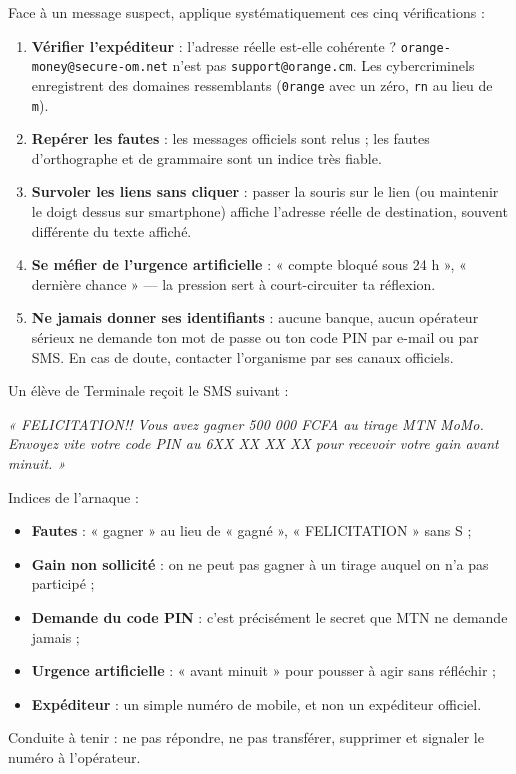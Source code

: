 \documentclass[11pt]{article}
\begin{document}
\begin{methode}
Face à un message suspect, applique systématiquement ces cinq vérifications :
\begin{enumerate}
  \item \textbf{Vérifier l'expéditeur} : l'adresse réelle est-elle cohérente ? \texttt{orange-money@secure-om.net} n'est pas \texttt{support@orange.cm}. Les cybercriminels enregistrent des domaines ressemblants (\texttt{0range} avec un zéro, \texttt{rn} au lieu de \texttt{m}).
  \item \textbf{Repérer les fautes} : les messages officiels sont relus ; les fautes d'orthographe et de grammaire sont un indice très fiable.
  \item \textbf{Survoler les liens sans cliquer} : passer la souris sur le lien (ou maintenir le doigt dessus sur smartphone) affiche l'adresse réelle de destination, souvent différente du texte affiché.
  \item \textbf{Se méfier de l'urgence artificielle} : « compte bloqué sous 24 h », « dernière chance » — la pression sert à court-circuiter ta réflexion.
  \item \textbf{Ne jamais donner ses identifiants} : aucune banque, aucun opérateur sérieux ne demande ton mot de passe ou ton code PIN par e-mail ou par SMS. En cas de doute, contacter l'organisme par ses canaux officiels.
\end{enumerate}
\end{methode}

\begin{exemplebox}
Un élève de Terminale reçoit le SMS suivant :
\begin{center}
\emph{« FELICITATION!! Vous avez gagner 500 000 FCFA au tirage MTN MoMo. Envoyez vite votre code PIN au 6XX XX XX XX pour recevoir votre gain avant minuit. »}
\end{center}
Indices de l'arnaque :
\begin{itemize}
  \item \textbf{Fautes} : « gagner » au lieu de « gagné », « FELICITATION » sans S ;
  \item \textbf{Gain non sollicité} : on ne peut pas gagner à un tirage auquel on n'a pas participé ;
  \item \textbf{Demande du code PIN} : c'est précisément le secret que MTN ne demande jamais ;
  \item \textbf{Urgence artificielle} : « avant minuit » pour pousser à agir sans réfléchir ;
  \item \textbf{Expéditeur} : un simple numéro de mobile, et non un expéditeur officiel.
\end{itemize}
Conduite à tenir : ne pas répondre, ne pas transférer, supprimer et signaler le numéro à l'opérateur.
\end{exemplebox}
\end{document}
